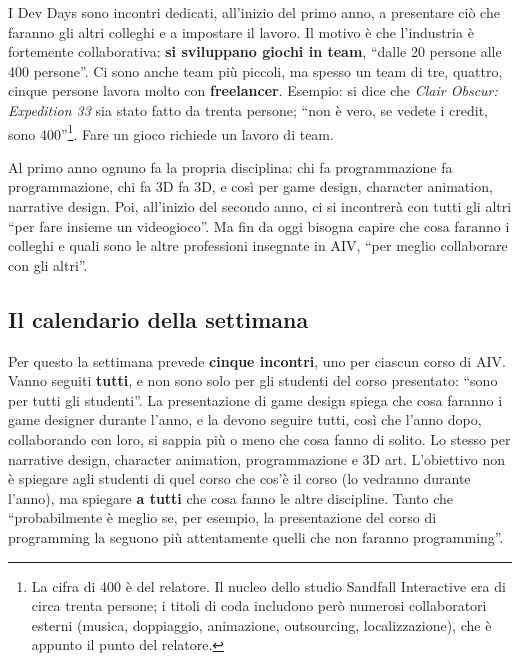 I Dev Days sono incontri dedicati, all'inizio del primo anno, a presentare
ciò che faranno gli altri colleghi e a impostare il lavoro. Il motivo è che
l'industria è fortemente collaborativa: \textbf{si sviluppano giochi in
team}, ``dalle 20 persone alle 400 persone''. Ci sono anche team più
piccoli, ma spesso un team di tre, quattro, cinque persone lavora molto con
\textbf{freelancer}. Esempio: si dice che \emph{Clair Obscur: Expedition 33}
sia stato fatto da trenta persone; ``non è vero, se vedete i credit, sono
400''\footnote{La cifra di 400 è del relatore. Il nucleo dello studio
Sandfall Interactive era di circa trenta persone; i titoli di coda includono
però numerosi collaboratori esterni (musica, doppiaggio, animazione,
outsourcing, localizzazione), che è appunto il punto del relatore.}. Fare
un gioco richiede un lavoro di team.

Al primo anno ognuno fa la propria disciplina: chi fa programmazione fa
programmazione, chi fa 3D fa 3D, e così per game design, character
animation, narrative design. Poi, all'inizio del secondo anno, ci si
incontrerà con tutti gli altri ``per fare insieme un videogioco''. Ma fin da
oggi bisogna capire che cosa faranno i colleghi e quali sono le altre
professioni insegnate in AIV, ``per meglio collaborare con gli altri''.

\subsection{Il calendario della settimana}

Per questo la settimana prevede \textbf{cinque incontri}, uno per ciascun
corso di AIV. Vanno seguiti \textbf{tutti}, e non sono solo per gli studenti
del corso presentato: ``sono per tutti gli studenti''. La presentazione di
game design spiega che cosa faranno i game designer durante l'anno, e la
devono seguire tutti, così che l'anno dopo, collaborando con loro, si sappia
più o meno che cosa fanno di solito. Lo stesso per narrative design,
character animation, programmazione e 3D art. L'obiettivo non è spiegare agli
studenti di quel corso che cos'è il corso (lo vedranno durante l'anno), ma
spiegare \textbf{a tutti} che cosa fanno le altre discipline. Tanto che
``probabilmente è meglio se, per esempio, la presentazione del corso di
programming la seguono più attentamente quelli che non faranno
programming''.


